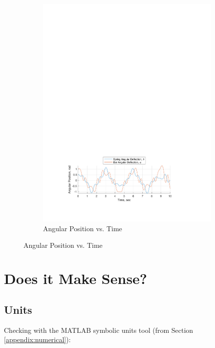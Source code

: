 \documentclass[12pt]{report}
\begin{document}
\begin{flushleft}
\begin{figure}[!htp] \ContinuedFloat
\begin{subfigure}[t]{\textwidth}
  \includegraphics[center]{angles_6-3}
  \caption{Angular Position vs. Time}
  \label{fig:angles:6-3}
\end{subfigure}
\end{figure}

\section{Does it Make Sense?}
\subsection{Units}
Checking with the MATLAB symbolic units tool (from Section \ref{appendix:numerical}): \\
~\\
% 

\end{flushleft}
\end{document}
